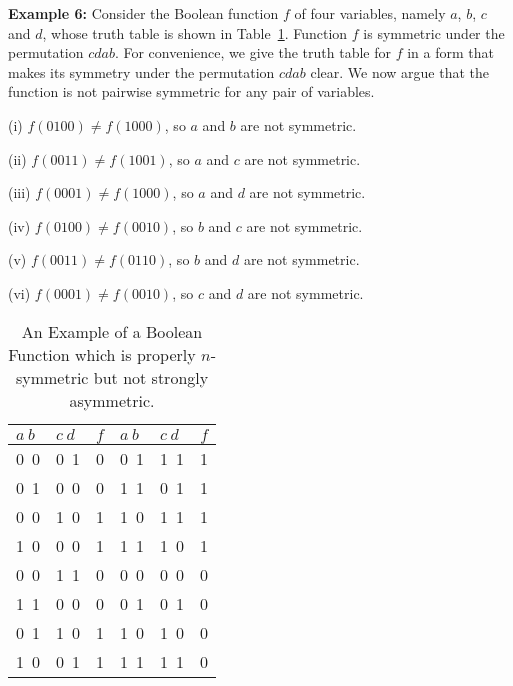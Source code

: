 \medskip

\noindent
\textbf{Example 6:}
Consider the Boolean function $f$ of four variables, 
namely $a$, $b$, $c$ and $d$,
whose truth table is shown in Table~\ref{tab:not_str_ssym_ex}.
Function $f$ is symmetric under the permutation $cdab$.
For convenience, we give the truth table for $f$ in a form
that makes its symmetry under the permutation $cdab$ clear.
We now argue that the function is
not pairwise symmetric for any pair of variables.

\medskip

\noindent
\begin{minipage}{0.05\textwidth}
\hspace*{0.08in}
\end{minipage}
\begin{minipage}{0.85\textwidth}
\begin{description}
\item{(i)} $f(0100) \neq f(1000)$, so $a$ and $b$ are not symmetric.
\item{(ii)} $f(0011) \neq f(1001)$, so $a$ and $c$ are not symmetric.
\item{(iii)} $f(0001) \neq f(1000)$, so $a$ and $d$ are not symmetric.
\item{(iv)} $f(0100) \neq f(0010)$, so $b$ and $c$ are not symmetric.
\item{(v)} $f(0011) \neq f(0110)$, so $b$ and $d$ are not symmetric.
\item{(vi)} $f(0001) \neq f(0010)$, so $c$ and $d$ are not symmetric.
\end{description}
\end{minipage}


\begin{table}[tb]
\begin{center}
\begin{tabular}{|l|l|c||l|l|c|}\hline
$a~b$ & $c~d$ & $f$ & $a~b$ & $c~d$ & $f$ \\ \hline\hline
0~0 & 0~1 & 0 & 0~1 & 1~1 & 1 \\ \hline
0~1 & 0~0 & 0 & 1~1 & 0~1 & 1  \\ \hline
0~0 & 1~0 & 1 & 1~0 & 1~1 & 1 \\ \hline
1~0 & 0~0 & 1 & 1~1 & 1~0 & 1 \\ \hline
0~0 & 1~1 & 0 & 0~0 & 0~0 & 0 \\ \hline
1~1 & 0~0 & 0 & 0~1 & 0~1 & 0 \\ \hline
0~1 & 1~0 & 1 & 1~0 & 1~0 & 0 \\ \hline
1~0 & 0~1 & 1 & 1~1 & 1~1 & 0 \\ \hline
\end{tabular}
\end{center}
\caption{An Example of a Boolean Function which is
properly $n$-symmetric but not strongly asymmetric.}
\label{tab:not_str_ssym_ex}
\end{table}

